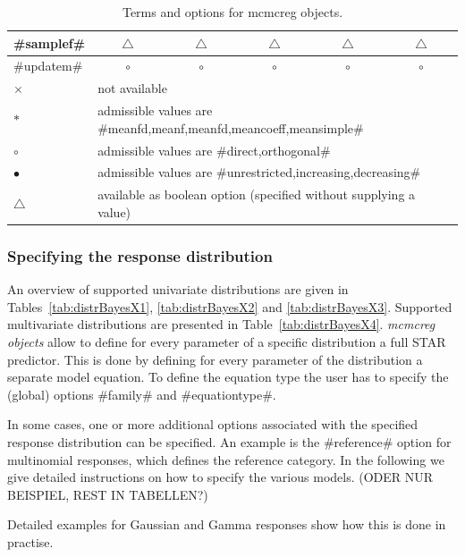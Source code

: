 \begin{table}
\begin{tabular}{|l||c|c|c|c|c|}
\hline
#samplef#  & $\triangle$ & $\triangle$  & $\triangle$  & $\triangle$ & $\triangle$  \\
\hline
#updatem#  & $\circ$ & $\circ$  & $\circ$  & $\circ$ & $\circ$  \\
\hline
$\times$    & \multicolumn{5}{l|}{not available} \\
\hline
$\ast$  & \multicolumn{5}{l|}{admissible values are #meanfd,meanf,meanfd,meancoeff,meansimple#} \\
\hline
$\circ$  & \multicolumn{5}{l|}{admissible values are #direct,orthogonal#} \\
\hline
$\bullet$  & \multicolumn{5}{l|}{admissible values are #unrestricted,increasing,decreasing#} \\
\hline
$\triangle$   & \multicolumn{5}{l|}{available as boolean option (specified without supplying a value)} \\
\hline
\end{tabular}
{\em\centering \caption{\label{mcmctermsoptions} Terms and options for mcmcreg objects.}}
\end{table}


               

\clearpage

\subsubsection{Specifying the response distribution}
 \label{mcmcregfamilysyntax}

An overview of supported univariate distributions are given in Tables~\ref{tab:distrBayesX1}, \ref{tab:distrBayesX2} and \ref{tab:distrBayesX3}. 
Supported multivariate distributions are presented in Table~\ref{tab:distrBayesX4}.
{\em mcmcreg objects}
allow to define for every parameter of a specific distribution a full STAR predictor. This is done
by defining for every parameter of the distribution a separate model equation. To define the equation
type the user has to specify the (global) options #family# and #equationtype#.




In some cases, one or more additional
options associated with the specified response distribution can be
specified. An example is the #reference# option for multinomial
responses, which defines the reference category. In the following
we give detailed instructions on how to specify the various
models. (ODER NUR BEISPIEL, REST IN TABELLEN?)


Detailed examples for Gaussian and Gamma responses
show how this is done in practise.





